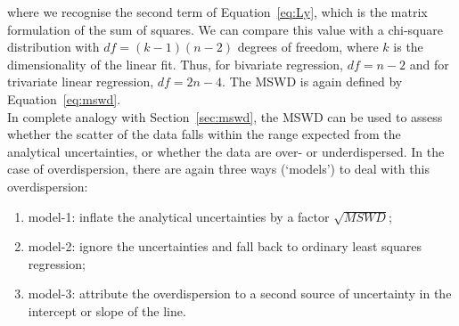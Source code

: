 \begin{refsection}
\noindent where we recognise the second term of Equation~\ref{eq:Ly},
which is the matrix formulation of the sum of squares. We can compare
this value with a chi-square distribution with $df = (k-1)(n-2)$
degrees of freedom, where $k$ is the dimensionality of the linear
fit. Thus, for bivariate regression, $df=n-2$ and for trivariate
linear regression, $df=2n-4$. The MSWD is again defined by
Equation~\ref{eq:mswd}.\\

In complete analogy with Section~\ref{sec:mswd}, the MSWD can be used
to assess whether the scatter of the data falls within the range
expected from the analytical uncertainties, or whether the data are
over- or underdispersed. In the case of overdispersion, there are
again three ways (`models') to deal with this overdispersion:

\begin{enumerate}
\item model-1: inflate the analytical uncertainties by a factor
  $\sqrt{MSWD}$;
\item model-2: ignore the uncertainties and fall back to ordinary
  least squares regression;
\item model-3: attribute the overdispersion to a second source of
  uncertainty in the intercept or slope of the line.
\end{enumerate}


\end{refsection}
